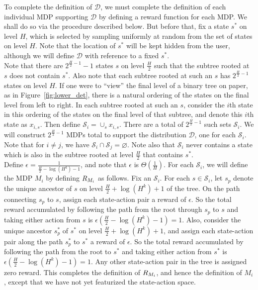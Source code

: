 \documentclass[11pt,twoside]{article}
\begin{document}
\noindent To complete the definition of $\mathcal{D}$, we must complete the definition of each individual MDP supporting $\mathcal{D}$ by defining a reward function for each MDP. We shall do so via the procedure described below. But before that, fix a state $s^*$ on level $H$, which is selected by sampling uniformly at random from the set of states on level $H$. Note that the location of $s^*$ will be kept hidden from the user, although we will define $\mathcal{D}$ with reference to a fixed $s^*$. \\

\noindent Note that there are $2^{\frac{H}{2} - 1} - 1$ states $s$ on level $\frac{H}{2}$ such that the subtree rooted at $s$ does not contain $s^*$. Also note that each subtree rooted at such an $s$ has $2^{\frac{H}{2} - 1}$ states on level $H$. If one were to ``view'' the final level of a binary tree on paper, as in Figure~\ref{fig:lower_det}, there is a natural ordering of the states on the final level from left to right. In each subtree rooted at such an $s$, consider the $i$th state in this ordering of the states on the final level of that subtree, and denote this $i$th state as $x_{i, s}$. Then define $\mathcal{S}_i = \cup_s x_{i, s}$. There are a total of $2^{\frac{H}{2} - 1}$ such sets $\mathcal{S}_i$. We will construct $2^{\frac{H}{2} - 1}$ MDPs total to support the distribution $\mathcal{D}$, one for each $\mathcal{S}_i$. Note that for $i \neq j$, we have $\mathcal{S}_i \cap \mathcal{S}_j = \varnothing$. Note also that $\mathcal{S}_i$ never contains a state which is also in the subtree rooted at level $\frac{H}{2}$ that contains $s^*$. \\

\noindent Define $\epsilon = \frac{1}{\frac{H}{2} - \log(H^k) - 1}$, and note that $\epsilon$ is $\Theta(\frac{1}{H})$. For each $\mathcal{S}_i$, we will define the MDP $M_i$ by defining $R_{M_i}$ as follows. Fix an $\mathcal{S}_i$. For each $s \in \mathcal{S}_i$, let $s_p$ denote the unique ancestor of $s$ on level $\frac{H}{2} + \log(H^k) + 1$ of the tree. On the path connecting $s_p$ to $s$, assign each state-action pair a reward of $\epsilon$. So the total reward accumulated by following the path from the root through $s_p$ to $s$ and taking either action from $s$ is $\epsilon (\frac{H}{2} - \log(H^k) - 1) = 1$. Also, consider the unique ancestor $s_p^*$ of $s^*$ on level $\frac{H}{2} + \log(H^k) + 1$, and assign each state-action pair along the path $s_p^*$ to $s^*$ a reward of $\epsilon$. So the total reward accumulated by following the path from the root to $s^*$ and taking either action from $s^*$ is $\epsilon (\frac{H}{2} - \log(H^k) - 1) = 1$. Any other state-action pair in the tree is assigned zero reward. This completes the definition of $R_{M_i}$, and hence the definition of $M_i$, except that we have not yet featurized the state-action space. \\
\end{document}
